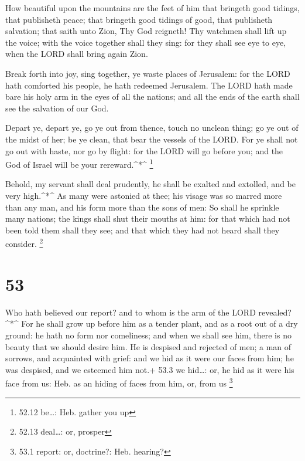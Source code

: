  How beautiful upon the mountains are the feet of him that
bringeth good tidings, that publisheth peace; that bringeth good tidings
of good, that publisheth salvation; that saith unto Zion, Thy God
reigneth!  Thy watchmen shall lift up the voice; with the
voice together shall they sing: for they shall see eye to eye, when the
LORD shall bring again Zion.

 Break forth into joy, sing together, ye waste places of
Jerusalem: for the LORD hath comforted his people, he hath redeemed
Jerusalem.  The LORD hath made bare his holy arm in the
eyes of all the nations; and all the ends of the earth shall see the
salvation of our God.

 Depart ye, depart ye, go ye out from thence, touch no
unclean thing; go ye out of the midst of her; be ye clean, that bear the
vessels of the LORD.  For ye shall not go out with haste,
nor go by flight: for the LORD will go before you; and the God of Israel
will be your rereward.\^{}*\^{} \footnote{52.12 be\ldots: Heb. gather
  you up}

 Behold, my servant shall deal prudently, he shall be
exalted and extolled, and be very high.\^{}*\^{}  As many
were astonied at thee; his visage was so marred more than any man, and
his form more than the sons of men:  So shall he sprinkle
many nations; the kings shall shut their mouths at him: for that which
had not been told them shall they see; and that which they had not heard
shall they consider. \footnote{52.13 deal\ldots: or, prosper}

\hypertarget{section-52}{%
\section{53}\label{section-52}}

 Who hath believed our report? and to whom is the arm of the
LORD revealed?\^{}*\^{}  For he shall grow up before him as
a tender plant, and as a root out of a dry ground: he hath no form nor
comeliness; and when we shall see him, there is no beauty that we should
desire him.  He is despised and rejected of men; a man of
sorrows, and acquainted with grief: and we hid as it were our faces from
him; he was despised, and we esteemed him not.+ 53.3 we hid\ldots: or,
he hid as it were his face from us: Heb. as an hiding of faces from him,
or, from us \footnote{53.1 report: or, doctrine?: Heb. hearing?}

